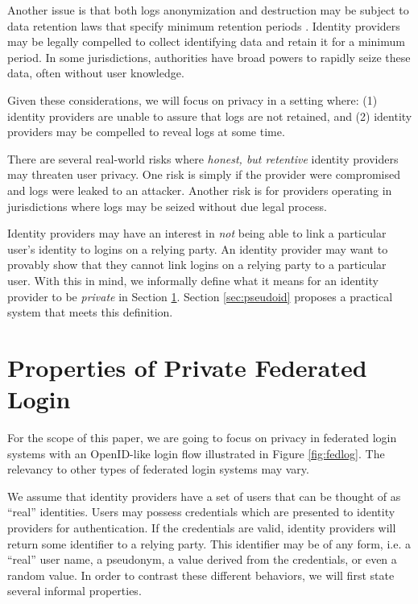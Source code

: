 \documentclass[11pt]{llncs}
\begin{document}
Another issue is that both logs anonymization and destruction may be
subject to data retention laws that specify minimum retention periods
\cite{EUDir}. Identity providers may be legally compelled to collect
identifying data and retain it for a minimum period. In some
jurisdictions, authorities have broad powers to rapidly seize these
data, often without user knowledge.

Given these considerations, we will focus on privacy in a setting where:
(1) identity providers are unable to assure that logs are not retained, and
(2) identity providers may be compelled to reveal logs at some time.

There are several real-world risks where \emph{honest, but retentive}
identity providers may threaten user privacy. One risk is simply if
the provider were compromised and logs were leaked to an
attacker. Another risk is for providers operating in jurisdictions
where logs may be seized without due legal process.

Identity providers may have an interest in \emph{not} being able to
link a particular user's identity to logins on a relying party. An
identity provider may want to provably show that they cannot link
logins on a relying party to a particular user. With this in mind, we
informally define what it means for an identity provider to be
\emph{private} in Section \ref{sec:private-fed-login}. Section
\ref{sec:pseudoid} proposes a practical system that meets this
definition.

\section{Properties of Private Federated Login}
\label{sec:private-fed-login}

For the scope of this paper, we are going to focus on privacy in
federated login systems with an OpenID-like login flow illustrated in
Figure \ref{fig:fedlog}. The relevancy to other types of federated
login systems may vary. 

We assume that identity providers have a set of users that can be
thought of as ``real'' identities. Users may possess credentials which
are presented to identity providers for authentication. If the credentials
are valid, identity providers will return some identifier to a relying
party. This identifier may be of any form, i.e. a ``real'' user name, a
pseudonym, a value derived from the credentials, or even a random
value. In order to contrast these different behaviors, we will first
state several informal properties.
\end{document}
